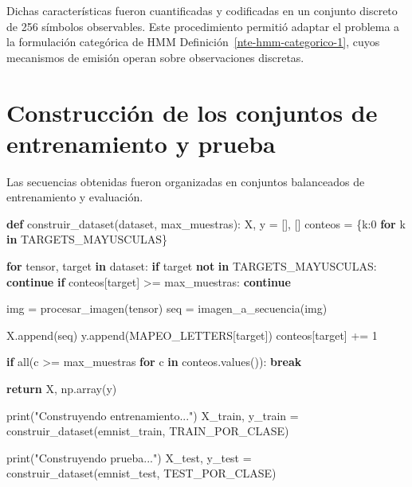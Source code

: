 \documentclass[
  spanish,
  us-letterpaper,
  DIV=11,
  numbers=noendperiod]{scrreprt}
\newenvironment{Shaded}{\begin{snugshade}}{\end{snugshade}}
\newcommand{\BuiltInTok}[1]{\textcolor[rgb]{0.00,0.23,0.31}{#1}}
\newcommand{\ControlFlowTok}[1]{\textcolor[rgb]{0.00,0.23,0.31}{\textbf{#1}}}
\newcommand{\DecValTok}[1]{\textcolor[rgb]{0.68,0.00,0.00}{#1}}
\newcommand{\KeywordTok}[1]{\textcolor[rgb]{0.00,0.23,0.31}{\textbf{#1}}}
\newcommand{\NormalTok}[1]{\textcolor[rgb]{0.00,0.23,0.31}{#1}}
\newcommand{\OperatorTok}[1]{\textcolor[rgb]{0.37,0.37,0.37}{#1}}
\newcommand{\StringTok}[1]{\textcolor[rgb]{0.13,0.47,0.30}{#1}}
\begin{document}
Dichas características fueron cuantificadas y codificadas en un conjunto
discreto de 256 símbolos observables. Este procedimiento permitió
adaptar el problema a la formulación categórica de HMM
Definición~\ref{nte-hmm-categorico-1}, cuyos mecanismos de emisión
operan sobre observaciones discretas.

\section{Construcción de los conjuntos de entrenamiento y
prueba}\label{construcciuxf3n-de-los-conjuntos-de-entrenamiento-y-prueba}

Las secuencias obtenidas fueron organizadas en conjuntos balanceados de
entrenamiento y evaluación.

\begin{Shaded}
\begin{Highlighting}[]
\KeywordTok{def}\NormalTok{ construir\_dataset(dataset, max\_muestras):}
\NormalTok{    X, y }\OperatorTok{=}\NormalTok{ [], []}
\NormalTok{    conteos }\OperatorTok{=}\NormalTok{ \{k:}\DecValTok{0} \ControlFlowTok{for}\NormalTok{ k }\KeywordTok{in}\NormalTok{ TARGETS\_MAYUSCULAS\}}

    \ControlFlowTok{for}\NormalTok{ tensor, target }\KeywordTok{in}\NormalTok{ dataset:}
        \ControlFlowTok{if}\NormalTok{ target }\KeywordTok{not} \KeywordTok{in}\NormalTok{ TARGETS\_MAYUSCULAS: }\ControlFlowTok{continue}
        \ControlFlowTok{if}\NormalTok{ conteos[target] }\OperatorTok{\textgreater{}=}\NormalTok{ max\_muestras: }\ControlFlowTok{continue}

\NormalTok{        img }\OperatorTok{=}\NormalTok{ procesar\_imagen(tensor)}
\NormalTok{        seq }\OperatorTok{=}\NormalTok{ imagen\_a\_secuencia(img)}

\NormalTok{        X.append(seq)}
\NormalTok{        y.append(MAPEO\_LETTERS[target])}
\NormalTok{        conteos[target] }\OperatorTok{+=} \DecValTok{1}

        \ControlFlowTok{if} \BuiltInTok{all}\NormalTok{(c }\OperatorTok{\textgreater{}=}\NormalTok{ max\_muestras }\ControlFlowTok{for}\NormalTok{ c }\KeywordTok{in}\NormalTok{ conteos.values()): }\ControlFlowTok{break}

    \ControlFlowTok{return}\NormalTok{ X, np.array(y)}

\BuiltInTok{print}\NormalTok{(}\StringTok{"Construyendo entrenamiento..."}\NormalTok{)}
\NormalTok{X\_train, y\_train }\OperatorTok{=}\NormalTok{ construir\_dataset(emnist\_train, TRAIN\_POR\_CLASE)}

\BuiltInTok{print}\NormalTok{(}\StringTok{"Construyendo prueba..."}\NormalTok{)}
\NormalTok{X\_test, y\_test }\OperatorTok{=}\NormalTok{ construir\_dataset(emnist\_test, TEST\_POR\_CLASE)}
\end{Highlighting}
\end{Shaded}
\end{document}
